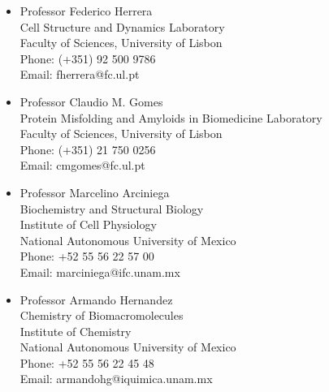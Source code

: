 \documentclass[letterpaper,11pt]{article}
\begin{document}
\begin{multicols}{2}
\begin{itemize}

\item Professor Federico Herrera \\
Cell Structure and Dynamics Laboratory \\
Faculty of Sciences, University of Lisbon \\
Phone: (+351) 92 500 9786 \\
Email: fherrera@fc.ul.pt

 \item Professor Claudio M. Gomes \\
 Protein Misfolding and Amyloids in Biomedicine Laboratory \\
 Faculty of Sciences, University of Lisbon \\
 Phone: (+351) 21 750 0256  \\
 Email: cmgomes@fc.ul.pt 

\item Professor Marcelino Arciniega \\
Biochemistry and Structural Biology \\
Institute of Cell Physiology \\
National Autonomous University of Mexico \\
Phone: +52 55 56 22 57 00 \\
Email: marciniega@ifc.unam.mx

\item Professor Armando Hernandez \\
Chemistry of Biomacromolecules \\
Institute of Chemistry \\
National Autonomous University of Mexico \\
Phone: +52 55 56 22 45 48 \\
Email: armandohg@iquimica.unam.mx


\end{itemize}
\end{multicols}

\end{document}
